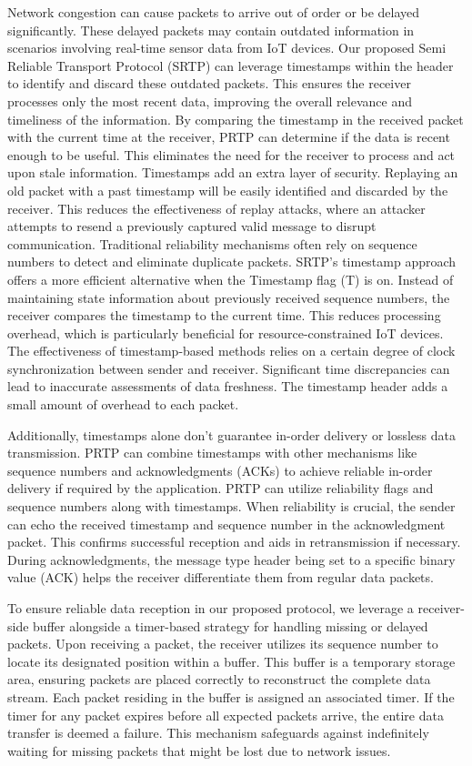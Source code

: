 \documentclass[lettersize,journal]{IEEEtran}
\begin{document}
Network congestion can cause packets to arrive out of order or be delayed significantly. These delayed packets may contain outdated information in scenarios involving real-time sensor data from IoT devices. Our proposed Semi Reliable Transport Protocol (SRTP) can leverage timestamps within the header to identify and discard these outdated packets. This ensures the receiver processes only the most recent data, improving the overall relevance and timeliness of the information. By comparing the timestamp in the received packet with the current time at the receiver, PRTP can determine if the data is recent enough to be useful. This eliminates the need for the receiver to process and act upon stale information. Timestamps add an extra layer of security. Replaying an old packet with a past timestamp will be easily identified and discarded by the receiver. This reduces the effectiveness of replay attacks, where an attacker attempts to resend a previously captured valid message to disrupt communication. Traditional reliability mechanisms often rely on sequence numbers to detect and eliminate duplicate packets. SRTP's timestamp approach offers a more efficient alternative when the Timestamp flag (T) is on. Instead of maintaining state information about previously received sequence numbers, the receiver compares the timestamp to the current time. This reduces processing overhead, which is particularly beneficial for resource-constrained IoT devices. The effectiveness of timestamp-based methods relies on a certain degree of clock synchronization between sender and receiver. Significant time discrepancies can lead to inaccurate assessments of data freshness. The timestamp header adds a small amount of overhead to each packet.

Additionally, timestamps alone don't guarantee in-order delivery or lossless data transmission. PRTP can combine timestamps with other mechanisms like sequence numbers and acknowledgments (ACKs) to achieve reliable in-order delivery if required by the application. PRTP can utilize reliability flags and sequence numbers along with timestamps. When reliability is crucial, the sender can echo the received timestamp and sequence number in the acknowledgment packet. This confirms successful reception and aids in retransmission if necessary. During acknowledgments, the message type header being set to a specific binary value (ACK) helps the receiver differentiate them from regular data packets. 

To ensure reliable data reception in our proposed protocol, we leverage a receiver-side buffer alongside a timer-based strategy for handling missing or delayed packets. Upon receiving a packet, the receiver utilizes its sequence number to locate its designated position within a buffer. This buffer is a temporary storage area, ensuring packets are placed correctly to reconstruct the complete data stream. Each packet residing in the buffer is assigned an associated timer. If the timer for any packet expires before all expected packets arrive, the entire data transfer is deemed a failure. This mechanism safeguards against indefinitely waiting for missing packets that might be lost due to network issues. 
\end{document}
